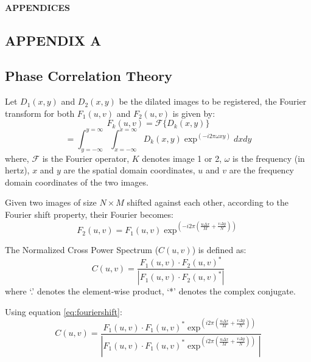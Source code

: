 

\thispagestyle{empty}
\begin{centering}
\Huge{\textbf{\\[8cm]\uppercase{Appendices}}}\\[1.2cm]
\end{centering}
\normalsize{}

\newpage
{}
\begin{spacing}{2}
\chapter*{\uppercase{Appendix A}} \label{A}
\section*{Phase Correlation Theory}
Let $D_{1}(x,y)$ and $D_{2}(x,y)$ be the dilated images to be registered, the Fourier transform for both $F_{1}(u,v)$ and $F_{2}(u,v)$ is given by:
\[F_{k}(u,v)= \mathcal{F}\{D_{k}(x,y)\}\]
\begin{equation}\label{eq:fourier}
=\int_{y=-\infty}^{y=\infty}\int_{x=-\infty}^{x=\infty}D_{k}(x,y)\exp^{\left(-i2\pi\omega xy\right)}dxdy
\end{equation}
where, $\mathcal{F}$ is the Fourier operator, $K$ denotes image 1 or 2, $\omega$ is the frequency (in hertz), $x$ and $y$ are the spatial domain coordinates, $u$ and $v$ are the frequency domain coordinates of the two images.

Given two images of size $N\times M$ shifted against each other, according to the Fourier shift property, their Fourier becomes:
\begin{equation}\label{eq:fouriershift}
F_{2}(u,v)= F_{1}(u,v)\exp^{\left(-i2\pi\left(\frac{u\Delta x}{M}+\frac{v\Delta y}{N}\right)\right)}
\end{equation}

The Normalized Cross Power Spectrum ($C(u,v)$) is defined as:
\begin{equation}
C(u,v)= \frac{F_{1}(u,v)\cdot F_{2}(u,v)^{*}}{\left|F_{1}(u,v)\cdot F_{2}(u,v)^{*}\right|}
\end{equation}
where `.' denotes the element-wise product, `*' denotes the complex conjugate.  

Using equation \ref{eq:fouriershift}:
\begin{equation}
C(u,v)= \frac{F_{1}(u,v)\cdot F_{1}(u,v)^{*}\exp^{\left(i2\pi\left(\frac{u\Delta x}{M}+\frac{v\Delta y}{N}\right)\right)}}{\left|F_{1}(u,v)\cdot F_{1}(u,v)^{*}\exp^{\left(i2\pi\left(\frac{u\Delta x}{M}+\frac{v\Delta y}{N}\right)\right)}\right|}
\end{equation}


\end{spacing}
